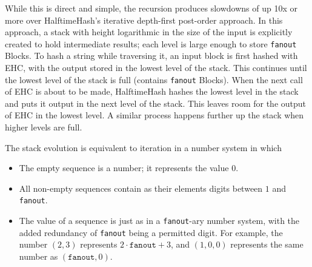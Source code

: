 \documentclass[sigconf, nonacm]{acmart}
\begin{document}
While this is direct and simple, the recursion produces slowdowns of up 10x or more over HalftimeHash's iterative depth-first post-order approach.
In this approach, a stack with height logarithmic in the size of the input is explicitly created to hold intermediate results; each level is large enough to store \texttt{fanout} Blocks.
To hash a string while traversing it, an input block is first hashed with EHC, with the output stored in the lowest level of the stack.
This continues until the lowest level of the stack is full (contains \texttt{fanout} Blocks).
When the next call of EHC is about to be made, HalftimeHash hashes the lowest level in the stack and puts it output in the next level of the stack.
This leaves room for the output of EHC in the lowest level.
A similar process happens further up the stack when higher levels are full.

The stack evolution is equivalent to iteration in a number system in which

\begin{itemize}
\item The empty sequence is a number; it represents the value $0$.
\item All non-empty sequences contain as their elements digits between $1$ and \texttt{fanout}.
\item The value of a sequence is just as in a \texttt{fanout}-ary number system, with the added redundancy of \texttt{fanout} being a permitted digit.
  For example, the number $(2,3)$ represents $2\cdot\texttt{fanout} + 3$, and $(1,0,0)$ represents the same number as $(\texttt{fanout},0)$.
\end{itemize}


\end{document}
